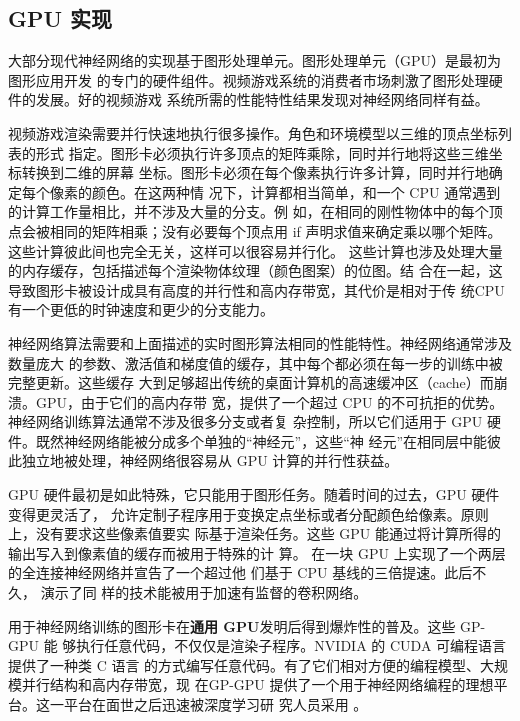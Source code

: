 \subsection{GPU 实现}
\label{subsec:gpu_implementations}

大部分现代神经网络的实现基于图形处理单元。图形处理单元（GPU）是最初为图形应用开发
的专门的硬件组件。视频游戏系统的消费者市场刺激了图形处理硬件的发展。好的视频游戏
系统所需的性能特性结果发现对神经网络同样有益。

视频游戏渲染需要并行快速地执行很多操作。角色和环境模型以三维的顶点坐标列表的形式
指定。图形卡必须执行许多顶点的矩阵乘除，同时并行地将这些三维坐标转换到二维的屏幕
坐标。图形卡必须在每个像素执行许多计算，同时并行地确定每个像素的颜色。在这两种情
况下，计算都相当简单，和一个 CPU 通常遇到的计算工作量相比，并不涉及大量的分支。例
如，在相同的刚性物体中的每个顶点会被相同的矩阵相乘；没有必要每个顶点用 {\serif
  if} 声明求值来确定乘以哪个矩阵。这些计算彼此间也完全无关，这样可以很容易并行化。
这些计算也涉及处理大量的内存缓存，包括描述每个渲染物体纹理（颜色图案）的位图。结
合在一起，这导致图形卡被设计成具有高度的并行性和高内存带宽，其代价是相对于传
统CPU 有一个更低的时钟速度和更少的分支能力。

神经网络算法需要和上面描述的实时图形算法相同的性能特性。神经网络通常涉及数量庞大
的参数、激活值和梯度值的缓存，其中每个都必须在每一步的训练中被完整更新。这些缓存
大到足够超出传统的桌面计算机的高速缓冲区（cache）而崩溃。GPU，由于它们的高内存带
宽，提供了一个超过 CPU 的不可抗拒的优势。神经网络训练算法通常不涉及很多分支或者复
杂控制，所以它们适用于 GPU 硬件。既然神经网络能被分成多个单独的“神经元”，这些“神
经元”在相同层中能彼此独立地被处理，神经网络很容易从 GPU 计算的并行性获益。

GPU 硬件最初是如此特殊，它只能用于图形任务。随着时间的过去，GPU 硬件变得更灵活了，
允许定制子程序用于变换定点坐标或者分配颜色给像素。原则上，没有要求这些像素值要实
际基于渲染任务。这些 GPU 能通过将计算所得的输出写入到像素值的缓存而被用于特殊的计
算。\citet{1575717} 在一块 GPU 上实现了一个两层的全连接神经网络并宣告了一个超过他
们基于 CPU 基线的三倍提速。此后不久，\citet{chellapilla:inria-00112631} 演示了同
样的技术能被用于加速有监督的卷积网络。

用于神经网络训练的图形卡在\textbf{通用 GPU}发明后得到爆炸性的普及。这些 GP-GPU 能
够执行任意代码，不仅仅是渲染子程序。NVIDIA 的 CUDA 可编程语言提供了一种类 C 语言
的方式编写任意代码。有了它们相对方便的编程模型、大规模并行结构和高内存带宽，现
在GP-GPU 提供了一个用于神经网络编程的理想平台。这一平台在面世之后迅速被深度学习研
究人员采用 \citep{Raina:2009:LDU:1553374.1553486,Cireşan2012333}。

